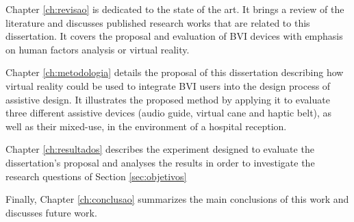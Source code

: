 Chapter \ref{ch:revisao} is dedicated to the state of the art. It brings a review of the literature and discusses published research works that are related to this dissertation. It covers the proposal and evaluation of BVI devices with emphasis on human factors analysis or virtual reality.

Chapter \ref{ch:metodologia} details the proposal of this dissertation describing how virtual reality could be used to integrate BVI users into the design process of assistive design. It illustrates the proposed method by applying it to evaluate three different assistive devices (audio guide, virtual cane and haptic belt), as well as their mixed-use, in the environment of a hospital reception. 

Chapter \ref{ch:resultados} describes the experiment designed to evaluate the dissertation's proposal and analyses the results in order to investigate the research questions of Section \ref{sec:objetivos}

Finally, Chapter \ref{ch:conclusao} summarizes the main conclusions of this work and discusses future work.
